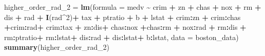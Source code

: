 \documentclass[
]{article}
\newenvironment{Shaded}{\begin{snugshade}}{\end{snugshade}}
\newcommand{\AttributeTok}[1]{\textcolor[rgb]{0.13,0.29,0.53}{#1}}
\newcommand{\DecValTok}[1]{\textcolor[rgb]{0.00,0.00,0.81}{#1}}
\newcommand{\FunctionTok}[1]{\textcolor[rgb]{0.13,0.29,0.53}{\textbf{#1}}}
\newcommand{\NormalTok}[1]{#1}
\newcommand{\OtherTok}[1]{\textcolor[rgb]{0.56,0.35,0.01}{#1}}
\newcommand{\SpecialCharTok}[1]{\textcolor[rgb]{0.81,0.36,0.00}{\textbf{#1}}}
\begin{document}
\begin{Shaded}
\begin{Highlighting}[]
\NormalTok{higher\_order\_rad\_2 }\OtherTok{=} \FunctionTok{lm}\NormalTok{(}\AttributeTok{formula =}\NormalTok{ medv }\SpecialCharTok{\textasciitilde{}}\NormalTok{ crim }\SpecialCharTok{+}\NormalTok{ zn }\SpecialCharTok{+}\NormalTok{ chas }\SpecialCharTok{+}\NormalTok{ nox }\SpecialCharTok{+}\NormalTok{ rm }\SpecialCharTok{+}\NormalTok{ dis }\SpecialCharTok{+}\NormalTok{ rad }\SpecialCharTok{+} \FunctionTok{I}\NormalTok{(rad}\SpecialCharTok{\^{}}\DecValTok{2}\NormalTok{)}\SpecialCharTok{+}\NormalTok{ tax }\SpecialCharTok{+}\NormalTok{ ptratio }\SpecialCharTok{+}\NormalTok{ b }\SpecialCharTok{+}\NormalTok{ lstat }\SpecialCharTok{+}\NormalTok{ crim}\SpecialCharTok{:}\NormalTok{zn }\SpecialCharTok{+}\NormalTok{ crim}\SpecialCharTok{:}\NormalTok{chas  }\SpecialCharTok{+}\NormalTok{crim}\SpecialCharTok{:}\NormalTok{rad}\SpecialCharTok{+}\NormalTok{ crim}\SpecialCharTok{:}\NormalTok{tax }\SpecialCharTok{+}\NormalTok{ zn}\SpecialCharTok{:}\NormalTok{dis}\SpecialCharTok{+}\NormalTok{ chas}\SpecialCharTok{:}\NormalTok{nox }\SpecialCharTok{+}\NormalTok{chas}\SpecialCharTok{:}\NormalTok{rm }\SpecialCharTok{+}\NormalTok{ nox}\SpecialCharTok{:}\NormalTok{rad }\SpecialCharTok{+}\NormalTok{ rm}\SpecialCharTok{:}\NormalTok{dis }\SpecialCharTok{+}\NormalTok{ rm}\SpecialCharTok{:}\NormalTok{ptratio}\SpecialCharTok{+}\NormalTok{ rm}\SpecialCharTok{:}\NormalTok{lstat}\SpecialCharTok{+}\NormalTok{ dis}\SpecialCharTok{:}\NormalTok{rad }\SpecialCharTok{+}\NormalTok{ dis}\SpecialCharTok{:}\NormalTok{lstat}\SpecialCharTok{+}\NormalTok{ b}\SpecialCharTok{:}\NormalTok{lstat, }\AttributeTok{data =}\NormalTok{ boston\_data)}
\FunctionTok{summary}\NormalTok{(higher\_order\_rad\_2)}
\end{Highlighting}
\end{Shaded}
\end{document}
